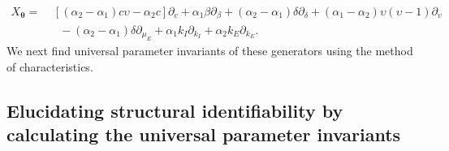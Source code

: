 \documentclass[12pt]{article}
\begin{document}
\begin{equation} 
\begin{split}
    X_{\boldsymbol{\theta}}=&\,\,[(\alpha_{2}-\alpha_{1})c\upsilon-\alpha_{2}c]\partial_{c}+\alpha_{1}\beta\partial_{\beta}+(\alpha_{2}-\alpha_{1})\delta\partial_{\delta}+(\alpha_{1}-\alpha_{2})\upsilon \left(\upsilon - 1\right)\partial_{\upsilon}\\
    &\,\,\,\,\,-(\alpha_{2}-\alpha_{1})\delta\partial_{\mu_{E}}+\alpha_{1}k_{I}\partial_{k_{I}}+\alpha_{2}k_{E}\partial_{k_{E}}.
    \end{split}
    \label{eq:X_SEI_app}
\end{equation}
We next find universal parameter invariants of these generators using the method of characteristics.


\subsection{Elucidating structural identifiability by calculating the universal parameter invariants}
\end{document}
